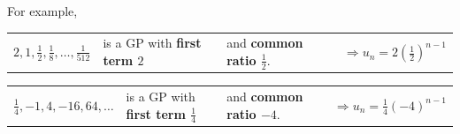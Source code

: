 \documentclass[11pt,a4paper]{book}
\begin{document}
For example, 

\begin{tasks}[label=(\alph*),label-width=3.5ex]

\task  %
\begin{tabular}{>{\raggedright}p{3cm}>{\raggedright}p{4.2cm}>{\raggedright}p{3.8cm}>{\raggedright}p{4cm}}
${\displaystyle 2,1,\frac{1}{2},\frac{1}{8},\ldots,\frac{1}{512}}$ & is a GP with \textbf{first term $2$} & and \textbf{common ratio ${\displaystyle \frac{1}{2}}$}.  & $\Rightarrow{\displaystyle u_{n}=2\left(\frac{1}{2}\right)^{n-1}}$\tabularnewline
\end{tabular}

\task  %
\begin{tabular}{>{\raggedright}p{3cm}>{\raggedright}p{4.2cm}>{\raggedright}p{3.8cm}>{\raggedright}p{4cm}}
${\displaystyle \frac{1}{4},-1,4,-16,64,\ldots}$ & is a GP with \textbf{first term ${\displaystyle \frac{1}{4}}$} & and \textbf{common ratio $-4$}.  & $\Rightarrow{\displaystyle u_{n}=\frac{1}{4}\left(-4\right)^{n-1}}$\tabularnewline
\end{tabular}

\end{tasks}
\end{document}
